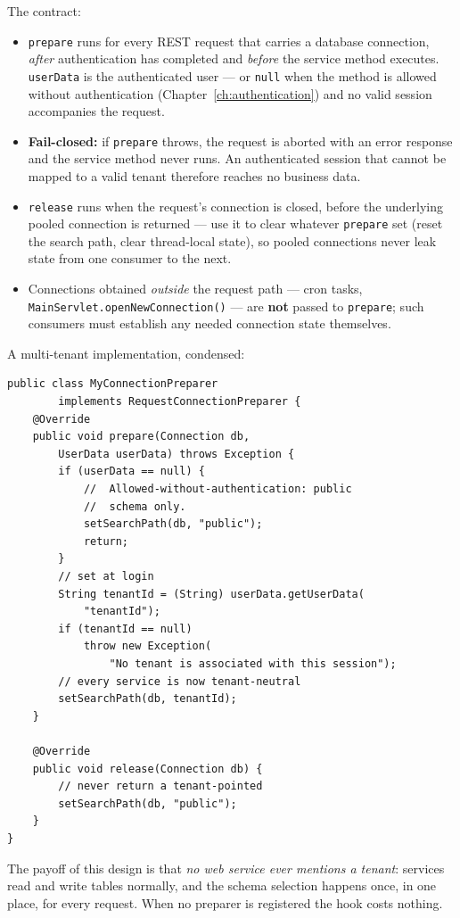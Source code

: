 The contract:

\begin{itemize}
  \item \texttt{prepare} runs for every REST request that carries a database connection, \emph{after} authentication has completed and \emph{before} the service method executes.  \texttt{userData} is the authenticated user --- or \texttt{null} when the method is allowed without authentication (Chapter~\ref{ch:authentication}) and no valid session accompanies the request.
  \item \textbf{Fail-closed:} if \texttt{prepare} throws, the request is aborted with an error response and the service method never runs.  An authenticated session that cannot be mapped to a valid tenant therefore reaches no business data.
  \item \texttt{release} runs when the request's connection is closed, before the underlying pooled connection is returned --- use it to clear whatever \texttt{prepare} set (reset the search path, clear thread-local state), so pooled connections never leak state from one consumer to the next.
  \item Connections obtained \emph{outside} the request path --- cron tasks, \texttt{MainServlet.openNewConnection()} --- are \textbf{not} passed to \texttt{prepare}; such consumers must establish any needed connection state themselves.
\end{itemize}

A multi-tenant implementation, condensed:

\begin{lstlisting}[style=java]
public class MyConnectionPreparer
        implements RequestConnectionPreparer {
    @Override
    public void prepare(Connection db,
        UserData userData) throws Exception {
        if (userData == null) {
            //  Allowed-without-authentication: public
            //  schema only.
            setSearchPath(db, "public");
            return;
        }
        // set at login
        String tenantId = (String) userData.getUserData(
            "tenantId");
        if (tenantId == null)
            throw new Exception(
                "No tenant is associated with this session");
        // every service is now tenant-neutral
        setSearchPath(db, tenantId);
    }

    @Override
    public void release(Connection db) {
        // never return a tenant-pointed
        setSearchPath(db, "public");
    }
}
\end{lstlisting}

\noindent
The payoff of this design is that \emph{no web service ever mentions a tenant}: services read and write tables normally, and the schema selection happens once, in one place, for every request.  When no preparer is registered the hook costs nothing.
